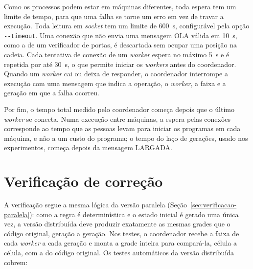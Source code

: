 Como os processos podem estar em máquinas diferentes, toda espera tem um limite de tempo, para que uma falha se torne um erro em vez de travar a execução. Toda leitura em \textit{socket} tem um limite de 600~s, configurável pela opção \texttt{-{}-timeout}. Uma conexão que não envia uma mensagem OLA válida em 10~s, como a de um verificador de portas, é descartada sem ocupar uma posição na cadeia. Cada tentativa de conexão de um \textit{worker} espera no máximo 5~s e é repetida por até 30~s, o que permite iniciar os \textit{workers} antes do coordenador. Quando um \textit{worker} cai ou deixa de responder, o coordenador interrompe a execução com uma mensagem que indica a operação, o \textit{worker}, a faixa e a geração em que a falha ocorreu.

Por fim, o tempo total medido pelo coordenador começa depois que o último \textit{worker} se conecta. Numa execução entre máquinas, a espera pelas conexões corresponde ao tempo que as pessoas levam para iniciar os programas em cada máquina, e não a um custo do programa; o tempo do laço de gerações, usado nos experimentos, começa depois da mensagem LARGADA.

\section{Verificação de correção}\label{sec:verificacao-distribuida}

A verificação segue a mesma lógica da versão paralela (Seção~\ref{sec:verificacao-paralela}): como a regra é determinística e o estado inicial é gerado uma única vez, a versão distribuída deve produzir exatamente as mesmas grades que o código original, geração a geração. Nos testes, o coordenador recebe a faixa de cada \textit{worker} a cada geração e monta a grade inteira para compará-la, célula a célula, com a do código original. Os testes automáticos da versão distribuída cobrem:

